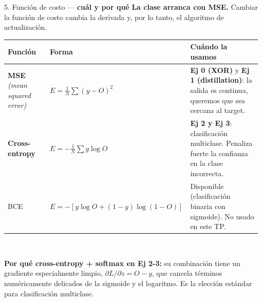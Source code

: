 \documentclass[11pt,aspectratio=169]{beamer}
\begin{document}
\begin{frame}{5. Función de costo — \textbf{cuál y por qué}}
\textbf{La clase arranca con MSE.} Cambiar la función de costo cambia la derivada y, por lo tanto, el algoritmo de actualización.\\[0.5em]

\centering\small
\begin{tabular}{@{}p{0.22\linewidth}p{0.34\linewidth}p{0.42\linewidth}@{}}
\toprule
\textbf{Función} & \textbf{Forma} & \textbf{Cuándo la usamos} \\
\midrule
\textbf{MSE} \emph{(mean squared error)} & $E = \frac{1}{N}\sum (y - O)^2$ & \textbf{Ej 0 (XOR)} y \textbf{Ej 1 (distillation)}: la salida es continua, queremos que sea cercana al target. \\
\rowcolor{accent2!10}
\textbf{Cross-entropy} & $E = -\frac{1}{N}\sum y \log O$ & \textbf{Ej 2 y Ej 3}: clasificación multiclase. Penaliza fuerte la confianza en la clase incorrecta. \\
BCE & $E = -[y \log O + (1-y) \log(1-O)]$ & Disponible (clasificación binaria con sigmoide). No usado en este TP. \\
\bottomrule
\end{tabular}\\[0.6em]

\begin{insight}
\textbf{Por qué cross-entropy + softmax en Ej 2-3:} su combinación tiene un gradiente especialmente limpio, $\partial L / \partial z = O - y$, que cancela términos numéricamente delicados de la sigmoide y el logaritmo. Es la elección estándar para clasificación multiclase.
\end{insight}
\end{frame}
\end{document}
